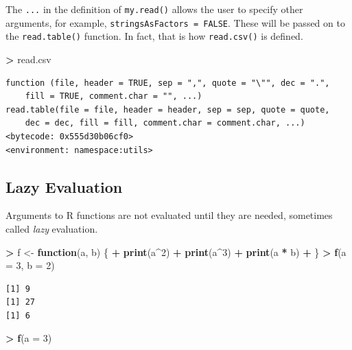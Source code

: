 \documentclass[]{krantz}
\makeatletter
\newenvironment{Shaded}{\begin{snugshade}}{\end{snugshade}}
\newcommand{\ControlFlowTok}[1]{\textcolor[rgb]{0.27,0.27,0.27}{\textbf{#1}}}
\newcommand{\DataTypeTok}[1]{\textcolor[rgb]{0.27,0.27,0.27}{#1}}
\newcommand{\DecValTok}[1]{\textcolor[rgb]{0.06,0.06,0.06}{#1}}
\newcommand{\KeywordTok}[1]{\textcolor[rgb]{0.27,0.27,0.27}{\textbf{#1}}}
\newcommand{\NormalTok}[1]{#1}
\newcommand{\OperatorTok}[1]{\textcolor[rgb]{0.43,0.43,0.43}{\textbf{#1}}}
\newcommand{\StringTok}[1]{\textcolor[rgb]{0.5,0.5,0.5}{#1}}
\newenvironment{kframe}{%
\medskip{}
\setlength{\fboxsep}{.8em}
 \def\at@end@of@kframe{}%
 \ifinner\ifhmode%
  \def\at@end@of@kframe{\end{minipage}}%
  \begin{minipage}{\columnwidth}%
 \fi\fi%
 \def\FrameCommand##1{\hskip\@totalleftmargin \hskip-\fboxsep
 \colorbox{shadecolor}{##1}\hskip-\fboxsep
     \hskip-\linewidth \hskip-\@totalleftmargin \hskip\columnwidth}%
 \MakeFramed {\advance\hsize-\width
   \@totalleftmargin\z@ \linewidth\hsize
   \@setminipage}}%
 {\par\unskip\endMakeFramed%
 \at@end@of@kframe}
\renewenvironment{Shaded}{\begin{kframe}}{\end{kframe}}
\makeatother
\begin{document}
The \texttt{...} in the definition of \texttt{my.read()} allows the user to specify other arguments, for example, \texttt{stringsAsFactors\ =\ FALSE}. These will be passed on to the \texttt{read.table()} function. In fact, that is how \texttt{read.csv()} is defined.

\begin{Shaded}
\begin{Highlighting}[]
\OperatorTok{>}\StringTok{ }\NormalTok{read.csv}
\end{Highlighting}
\end{Shaded}

\begin{verbatim}
function (file, header = TRUE, sep = ",", quote = "\"", dec = ".", 
    fill = TRUE, comment.char = "", ...) 
read.table(file = file, header = header, sep = sep, quote = quote, 
    dec = dec, fill = fill, comment.char = comment.char, ...)
<bytecode: 0x555d30b06cf0>
<environment: namespace:utils>
\end{verbatim}

\hypertarget{lazy-evaluation}{%
\subsection{Lazy Evaluation}\label{lazy-evaluation}}

Arguments to R functions are not evaluated until they are needed, sometimes called \emph{lazy} evaluation.

\begin{Shaded}
\begin{Highlighting}[]
\OperatorTok{>}\StringTok{ }\NormalTok{f <-}\StringTok{ }\ControlFlowTok{function}\NormalTok{(a, b) \{}
\OperatorTok{+}\StringTok{   }\KeywordTok{print}\NormalTok{(a}\OperatorTok{^}\DecValTok{2}\NormalTok{)}
\OperatorTok{+}\StringTok{   }\KeywordTok{print}\NormalTok{(a}\OperatorTok{^}\DecValTok{3}\NormalTok{)}
\OperatorTok{+}\StringTok{   }\KeywordTok{print}\NormalTok{(a }\OperatorTok{*}\StringTok{ }\NormalTok{b)}
\OperatorTok{+}\StringTok{ }\NormalTok{\}}
\OperatorTok{>}\StringTok{ }\KeywordTok{f}\NormalTok{(}\DataTypeTok{a =} \DecValTok{3}\NormalTok{, }\DataTypeTok{b =} \DecValTok{2}\NormalTok{)}
\end{Highlighting}
\end{Shaded}

\begin{verbatim}
[1] 9
[1] 27
[1] 6
\end{verbatim}

\begin{Shaded}
\begin{Highlighting}[]
\OperatorTok{>}\StringTok{ }\KeywordTok{f}\NormalTok{(}\DataTypeTok{a =} \DecValTok{3}\NormalTok{)}
\end{Highlighting}
\end{Shaded}
\end{document}
